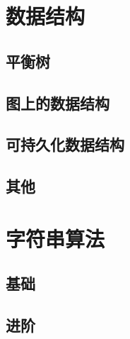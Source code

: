 \documentclass[12pt,a4paper,titlepage]{article}
\begin{document}
    
    

\section{\LARGE 数据结构}
	\subsection{平衡树}
    
    
    
	

	\subsection{图上的数据结构}
	
    

	\subsection{可持久化数据结构}
	
    

	\subsection{其他}
	

\section{\LARGE 字符串算法}
	\subsection{基础}
	
	
    
    
    
    

	\subsection{进阶}
	
    
	
    
\end{document}
